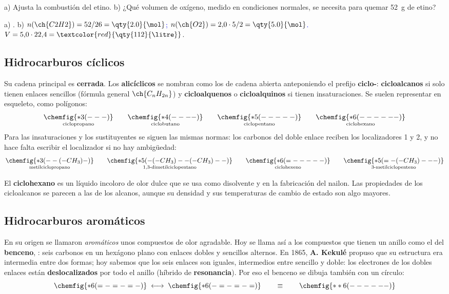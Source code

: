 \begin{exercise}
    a) Ajusta la combustión del etino. b) ¿Qué volumen de oxígeno, medido en condiciones normales, se necesita para quemar
    \qty{52}{\gram} de etino?
    \begin{solu}
        a) \textcolor{red}{}. b) \textcolor{blue}{\(n(\ch{C2H2}) = 52/26 = \qty{2.0}{\mol}\);
        \(n(\ch{O2}) = 2{,}0 \cdot 5/2 = \qty{5.0}{\mol}\).} \(V = 5{,}0 \cdot 22{,}4 = \textcolor{red}{\qty{112}{\litre}}\).
    \end{solu}
\end{exercise}

\subsection{Hidrocarburos cíclicos}

Su cadena principal es \textbf{cerrada}. Los \textbf{alicíclicos} se nombran como los de cadena abierta anteponiendo el prefijo
\textbf{ciclo-}: \textbf{cicloalcanos} si solo tienen enlaces sencillos (fórmula general \(\ch{C_nH_{2n}}\)) y
\textbf{cicloalquenos} o \textbf{cicloalquinos} si tienen insaturaciones. Se suelen representar en esqueleto, como polígonos:
\[ \underset{\text{ciclopropano}}{\chemfig{*3(---)}} \qquad \underset{\text{ciclobutano}}{\chemfig{*4(----)}} \qquad
   \underset{\text{ciclopentano}}{\chemfig{*5(-----)}} \qquad \underset{\text{ciclohexano}}{\chemfig{*6(------)}} \]
Para las insaturaciones y los sustituyentes se siguen las mismas normas: los carbonos del doble enlace reciben los localizadores 1 y
2, y no hace falta escribir el localizador si no hay ambigüedad:
\[ \underset{\text{metilciclopropano}}{\chemfig{*3(--(-CH_3)-)}} \qquad
   \underset{\text{1,3-dimetilciclopentano}}{\chemfig{*5(-(-CH_3)--(-CH_3)--)}} \qquad
   \underset{\text{ciclohexeno}}{\chemfig{*6(=-----)}} \qquad
   \underset{\text{3-metilciclopenteno}}{\chemfig{*5(=-(-CH_3)---)}} \]

El \textbf{ciclohexano} es un líquido incoloro de olor dulce que se usa como disolvente y en la fabricación del nailon. Las
propiedades de los cicloalcanos se parecen a las de los alcanos, aunque su densidad y sus temperaturas de cambio de estado son algo
mayores.

\subsection{Hidrocarburos aromáticos}

En su origen se llamaron \emph{aromáticos} unos compuestos de olor agradable. Hoy se llama así a los compuestos que tienen un
anillo como el del \textbf{benceno}, : seis carbonos en un hexágono plano con enlaces dobles y sencillos alternos. En
1865, \textbf{A. Kekulé} propuso que su estructura era intermedia entre dos formas; hoy sabemos que los seis enlaces  son
iguales, intermedios entre sencillo y doble: los electrones de los dobles enlaces están \textbf{deslocalizados} por todo el anillo
(híbrido de \textbf{resonancia}). Por eso el benceno se dibuja también con un círculo:
\[ \chemfig{*6(=-=-=-)} \;\longleftrightarrow\; \chemfig{*6(-=-=-=)} \qquad \equiv \qquad \chemfig{**6(------)} \]

